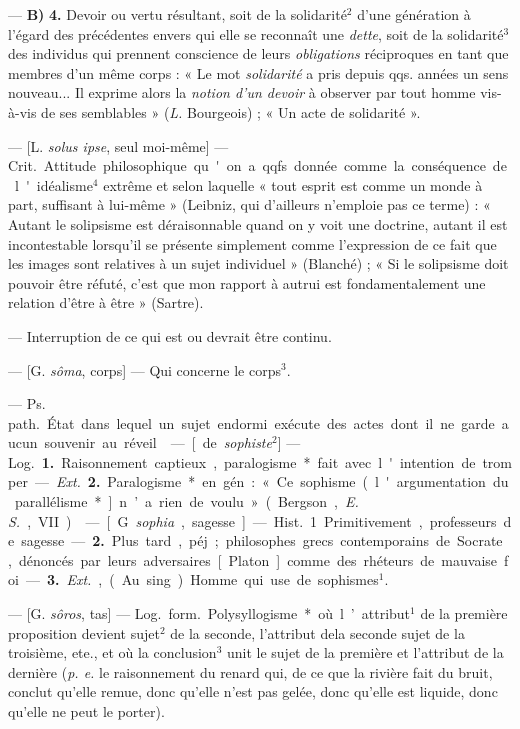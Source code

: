 \begin{itemize}[leftmargin=1cm, label=, itemsep=1pt]
— {\bf B)}  {\bf 4.} Devoir ou vertu résultant, soit de la
solidarité$^2$ d’une génération à l'égard des précédentes envers qui elle se
reconnaît une {\it dette}, soit de la solidarité$^3$ des individus qui
prennent conscience de leurs {\it obligations} réciproques en tant que
membres d’un même corps : « Le mot {\it solidarité} a pris depuis qqs. années
un sens nouveau... Il exprime alors la {\it notion d’un devoir} à observer
par tout homme vis-à-vis de ses semblables » ({\it L.} Bourgeois) ; « Un acte
de solidarité ».

 — [L. {\it solus ipse}, seul moi-même] — \si{Crit.} Attitude
philosophique qu'on a qqfs. donnée comme la conséquence de l'idéalisme$^4$
extrême et selon laquelle « tout esprit est comme un monde à part, suffisant
à lui-même » (Leibniz, qui d’ailleurs n’emploie pas ce terme) : « Autant le
solipsisme est déraisonnable quand on y voit une doctrine, autant il est
incontestable lorsqu'il se présente simplement comme l'expression de ce fait
que les images sont relatives à un sujet individuel » (Blanché) ; « Si le
solipsisme doit pouvoir être réfuté, c'est que mon rapport à autrui est
fondamentalement une relation d’être à être » (Sartre).

 — Interruption
de ce qui est ou devrait être continu.

 — [G. {\it sôma}, corps] — Qui concerne le corps$^3$.

 — \si{Ps. path.} État dans lequel un sujet endormi exécute
des actes dont il ne garde aucun souvenir au réveil.

 — [de {\it sophiste}$^2$] — \si{Log.} {\bf 1.} Raisonnement
captieux, paralogisme*
fait avec l'intention de tromper. — {\it Ext.} {\bf 2.} Paralogisme* en
gén. : « Ce sophisme (l'argumentation du parallélisme*] n’a rien de voulu
» (Bergson, {\it E. S.}, VII).

 — [G. {\it sophia}, sagesse] — \si{Hist.} 1. Primitivement,
professeurs de sagesse. — {\bf 2.} Plus tard., péj. ; philosophes grecs
contemporains de Socrate, dénoncés par leurs adversaires [Platon] comme des
rhéteurs de mauvaise foi. — {\bf 3.} {\it Ext.}, (Au sing.) Homme qui use de
sophismes$^1$.

 — [G. {\it sôros}, tas] — \si{Log.} \si{form.} Polysyllogisme* où
l’attribut$^1$ de la première proposition devient sujet$^2$ de la seconde,
l’attribut dela seconde sujet de la troisième, ete., et où la conclusion$^3$
unit le sujet de la première et l’attribut de la dernière ({\it p. e.} le
raisonnement du renard qui, de ce que la rivière fait du bruit, conclut
qu’elle remue, donc qu’elle n’est pas gelée, donc qu’elle est liquide, donc
qu'elle ne peut le porter).


\end{itemize}
